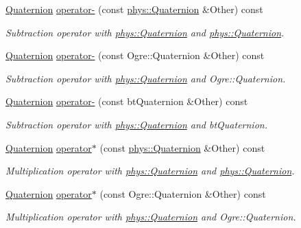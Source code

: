 \begin{DoxyCompactItemize}
\hyperlink{classphys_1_1Quaternion}{Quaternion} \hyperlink{classphys_1_1Quaternion_abab2d787eefc90bbc6710091a5a79234}{operator-\/} (const \hyperlink{classphys_1_1Quaternion}{phys::Quaternion} \&Other) const 
\begin{DoxyCompactList}\small\item\em Subtraction operator with \hyperlink{classphys_1_1Quaternion}{phys::Quaternion} and \hyperlink{classphys_1_1Quaternion}{phys::Quaternion}. \item\end{DoxyCompactList}\item 
\hyperlink{classphys_1_1Quaternion}{Quaternion} \hyperlink{classphys_1_1Quaternion_a01c5412ce8f1ebb212c9afd7e19feb1e}{operator-\/} (const Ogre::Quaternion \&Other) const 
\begin{DoxyCompactList}\small\item\em Subtraction operator with \hyperlink{classphys_1_1Quaternion}{phys::Quaternion} and Ogre::Quaternion. \item\end{DoxyCompactList}\item 
\hyperlink{classphys_1_1Quaternion}{Quaternion} \hyperlink{classphys_1_1Quaternion_aca49f84681f836545c30c0b42480dccc}{operator-\/} (const btQuaternion \&Other) const 
\begin{DoxyCompactList}\small\item\em Subtraction operator with \hyperlink{classphys_1_1Quaternion}{phys::Quaternion} and btQuaternion. \item\end{DoxyCompactList}\item 
\hyperlink{classphys_1_1Quaternion}{Quaternion} \hyperlink{classphys_1_1Quaternion_a2b1017fc916a896440a00bee3fd3ca9b}{operator$\ast$} (const \hyperlink{classphys_1_1Quaternion}{phys::Quaternion} \&Other) const 
\begin{DoxyCompactList}\small\item\em Multiplication operator with \hyperlink{classphys_1_1Quaternion}{phys::Quaternion} and \hyperlink{classphys_1_1Quaternion}{phys::Quaternion}. \item\end{DoxyCompactList}\item 
\hyperlink{classphys_1_1Quaternion}{Quaternion} \hyperlink{classphys_1_1Quaternion_ae37df9d07e51739908e05a4bd518c1e1}{operator$\ast$} (const Ogre::Quaternion \&Other) const 
\begin{DoxyCompactList}\small\item\em Multiplication operator with \hyperlink{classphys_1_1Quaternion}{phys::Quaternion} and Ogre::Quaternion. \item\end{DoxyCompactList}\item 

\end{DoxyCompactItemize}
